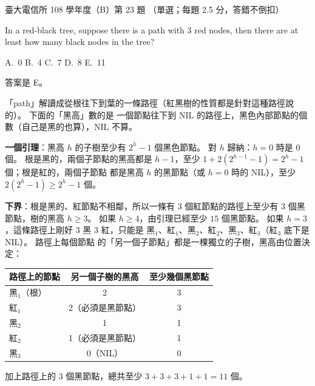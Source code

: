 \begin{pastexam}[label={px:ntu-108-comm-dsab-23}]{臺大電信所 108 學年度（B）第 23 題}
（單選；每題 2.5 分，答錯不倒扣）

In a red-black tree, suppose there is a path with 3 red nodes, then there are at least how many
black nodes in the tree?

A.~0 \qquad B.~4 \qquad C.~7 \qquad D.~8 \qquad E.~11
\end{pastexam}

\begin{pastsoln}
答案是 E。

「path」解讀成從根往下到葉的一條路徑（紅黑樹的性質都是針對這種路徑說的）。 下面的「黑高」數的是
一個節點往下到 NIL 的路徑上，黑色內部節點的個數（自己是黑的也算），NIL 不算。

\textbf{一個引理}：黑高 $h$ 的子樹至少有 $2^h - 1$ 個黑色節點。 對 $h$ 歸納：$h = 0$ 時是 $0$ 個。
根是黑的，兩個子節點的黑高都是 $h - 1$，至少 $1 + 2(2^{h-1} - 1) = 2^h - 1$ 個；根是紅的，兩個子節點
都是黑高 $h$ 的黑節點（或 $h = 0$ 時的 NIL），至少 $2(2^h - 1) \ge 2^h - 1$ 個。

\textbf{下界}：根是黑的、紅節點不相鄰，所以一條有 $3$ 個紅節點的路徑上至少有 $3$ 個黑節點，樹的黑高
$h \ge 3$。 如果 $h \ge 4$，由引理已經至少 $15$ 個黑節點。 如果 $h = 3$，這條路徑上剛好 $3$ 黑
$3$ 紅，只能是 黑$_1$、紅$_1$、黑$_2$、紅$_2$、黑$_3$、紅$_3$（紅$_3$ 底下是 NIL）。 路徑上每個節點
的「另一個子節點」都是一棵獨立的子樹，黑高由位置決定：
\begin{center}
\begin{tabular}{lcc}
\toprule
路徑上的節點 & 另一個子樹的黑高 & 至少幾個黑節點 \\
\midrule
黑$_1$（根） & 2 & 3 \\
紅$_1$ & 2（必須是黑節點） & 3 \\
黑$_2$ & 1 & 1 \\
紅$_2$ & 1（必須是黑節點） & 1 \\
黑$_3$ & 0（NIL） & 0 \\
\bottomrule
\end{tabular}
\end{center}
加上路徑上的 $3$ 個黑節點，總共至少 $3 + 3 + 3 + 1 + 1 = 11$ 個。


\end{pastsoln}
